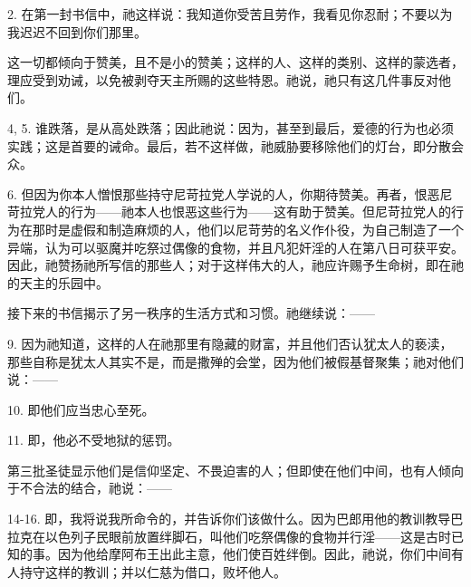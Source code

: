 2. 在第一封书信中，祂这样说：我知道你受苦且劳作，我看见你忍耐；不要以为我迟迟不回到你们那里。\par

这一切都倾向于赞美，且不是小的赞美；这样的人、这样的类别、这样的蒙选者，理应受到劝诫，以免被剥夺天主所赐的这些特恩。祂说，祂只有这几件事反对他们。\par

4, 5. 谁跌落，是从高处跌落；因此祂说：因为，甚至到最后，爱德的行为也必须实践；这是首要的诫命。最后，若不这样做，祂威胁要移除他们的灯台，即分散会众。\par

6. 但因为你本人憎恨那些持守尼苛拉党人学说的人，你期待赞美。再者，恨恶尼苛拉党人的行为——祂本人也恨恶这些行为——这有助于赞美。但尼苛拉党人的行为在那时是虚假和制造麻烦的人，他们以尼苛劳的名义作仆役，为自己制造了一个异端，认为可以驱魔并吃祭过偶像的食物，并且凡犯奸淫的人在第八日可获平安。因此，祂赞扬祂所写信的那些人；对于这样伟大的人，祂应许赐予生命树，即在祂的天主的乐园中。\par

接下来的书信揭示了另一秩序的生活方式和习惯。祂继续说：——\par

9. 因为祂知道，这样的人在祂那里有隐藏的财富，并且他们否认犹太人的亵渎，那些自称是犹太人其实不是，而是撒殚的会堂，因为他们被假基督聚集；祂对他们说：——\par

10. 即他们应当忠心至死。\par

11. 即，他必不受地狱的惩罚。\par

第三批圣徒显示他们是信仰坚定、不畏迫害的人；但即使在他们中间，也有人倾向于不合法的结合，祂说：——\par

14-16. 即，我将说我所命令的，并告诉你们该做什么。因为巴郎用他的教训教导巴拉克在以色列子民眼前放置绊脚石，叫他们吃祭偶像的食物并行淫——这是古时已知的事。因为他给摩阿布王出此主意，他们使百姓绊倒。因此，祂说，你们中间有人持守这样的教训；并以仁慈为借口，败坏他人。\par

